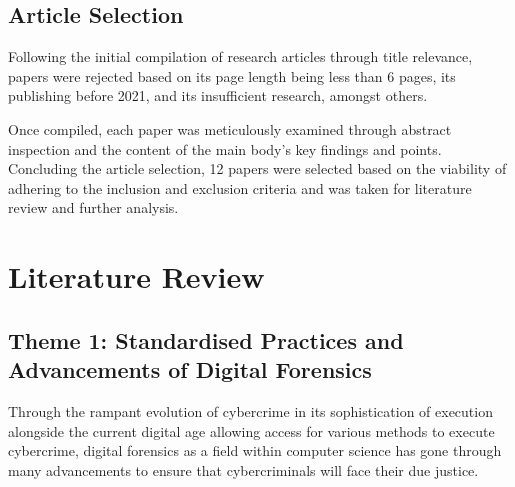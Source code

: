 \documentclass[12pt,a4paper]{article}
\begin{document}



\subsection{Article Selection}

Following the initial compilation of research articles through title relevance, papers were rejected based on its page length being less than 6 pages, its publishing before 2021, and its insufficient research, amongst others. 

Once compiled, each paper was meticulously examined through abstract inspection and the content of the main body’s key findings and points. Concluding the article selection, 12 papers were selected based on the viability of adhering to the inclusion and exclusion criteria and was taken for literature review and further analysis.










\section{Literature Review}

\subsection{Theme 1: Standardised Practices and Advancements of Digital Forensics}

Through the rampant evolution of cybercrime in its sophistication of execution alongside the current digital age allowing access for various methods to execute cybercrime, digital forensics as a field within computer science has gone through many advancements to ensure that cybercriminals will face their due justice. 
\end{document}

